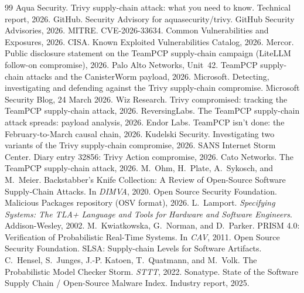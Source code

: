 \documentclass[letterpaper,twocolumn,10pt]{article}
\begin{document}
\begin{thebibliography}{99}\small
{} Aqua Security. Trivy supply-chain attack: what you need to know. Technical report, 2026.
 GitHub. Security Advisory for aquasecurity/trivy. GitHub Security Advisories, 2026.
 MITRE. CVE-2026-33634. Common Vulnerabilities and Exposures, 2026.
 CISA. Known Exploited Vulnerabilities Catalog, 2026.
 Mercor. Public disclosure statement on the TeamPCP supply-chain campaign (LiteLLM follow-on compromise), 2026.
 Palo Alto Networks, Unit~42. TeamPCP supply-chain attacks and the CanisterWorm payload, 2026.
 Microsoft. Detecting, investigating and defending against the Trivy supply-chain compromise. Microsoft Security Blog, 24 March 2026.
 Wiz Research. Trivy compromised: tracking the TeamPCP supply-chain attack, 2026.
 ReversingLabs. The TeamPCP supply-chain attack spreads: payload analysis, 2026.
 Endor Labs. TeamPCP isn't done: the February-to-March causal chain, 2026.
 Kudelski Security. Investigating two variants of the Trivy supply-chain compromise, 2026.
 SANS Internet Storm Center. Diary entry 32856: Trivy Action compromise, 2026.
 Cato Networks. The TeamPCP supply-chain attack, 2026.
 M.~Ohm, H.~Plate, A.~Sykosch, and M.~Meier. Backstabber's Knife Collection: A Review of Open-Source Software Supply-Chain Attacks. In \emph{DIMVA}, 2020.
 Open Source Security Foundation. Malicious Packages repository (OSV format), 2026.
 L.~Lamport. \emph{Specifying Systems: The TLA+ Language and Tools for Hardware and Software Engineers}. Addison-Wesley, 2002.
 M.~Kwiatkowska, G.~Norman, and D.~Parker. PRISM 4.0: Verification of Probabilistic Real-Time Systems. In \emph{CAV}, 2011.
 Open Source Security Foundation. SLSA: Supply-chain Levels for Software Artifacts.
 C.~Hensel, S.~Junges, J.-P. Katoen, T.~Quatmann, and M.~Volk. The Probabilistic Model Checker Storm. \emph{STTT}, 2022.
 Sonatype. State of the Software Supply Chain / Open-Source Malware Index. Industry report, 2025.
\end{thebibliography}
\end{document}
